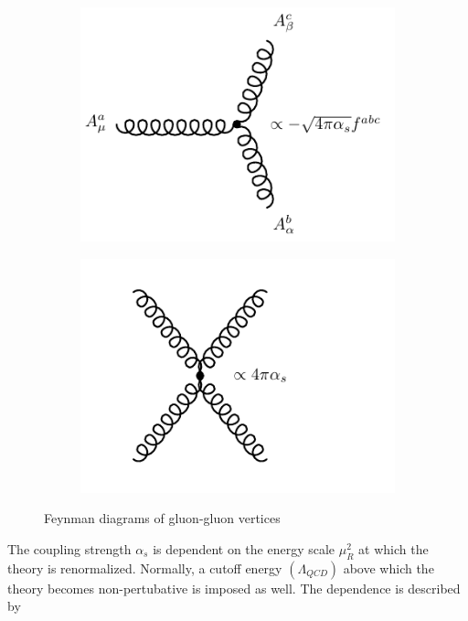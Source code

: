 \begin{figure}[!h]
\begin{subfigure}{0.5\textwidth}
   \includegraphics[width=\textwidth]{figures/ggg.pdf}
\caption{}
\label{fig:ggVeta}
\end{subfigure} %
\begin{subfigure}{0.5\textwidth}
   \includegraphics[width=\textwidth]{figures/g4.pdf}
\caption{}
\label{fig:ggVetb}
\end{subfigure}
\caption{Feynman diagrams of gluon-gluon vertices}
\end{figure}

\par The coupling strength $\alpha_s$ is dependent on the energy scale $\mu_R^2$ 
at which the theory is renormalized. Normally, a cutoff energy $(\Lambda_{QCD})$ above which 
the theory becomes non-pertubative is imposed as well. The 
dependence is described by 
 
